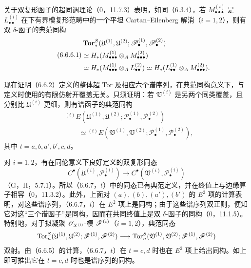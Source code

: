 关于双复形函子的超同调理论（0，11.7.3）表明，如同（6.3.4），若
$M^{(i)}_{\bullet\bullet\bullet}$ 是 $L^{(i)}_{\bullet\bullet}$ 在下有界模复形范畴中的一个平坦 Cartan--Eilenberg 解消（$i=1,2$），则有双 $\delta$-函子的典范同构
\begin{equation}\tag{6.6.6.1}
\begin{aligned}
 &\operatorname{\mathbf{Tor}}^S_*(\mathfrak U^{(1)},\mathfrak U^{(2)};
                    \mathscr P^{(1)}_\bullet,\mathscr P^{(2)}_\bullet)\\
 &\simeq H_*(M^{(1)}_{\bullet\bullet\bullet}\otimes_AM^{(2)}_{\bullet\bullet\bullet})\\
 &\simeq H_*(M^{(1)}_{\bullet\bullet\bullet}\otimes_AL^{(2)}_{\bullet\bullet})
 \simeq H_*(L^{(1)}_{\bullet\bullet}\otimes_AM^{(2)}_{\bullet\bullet\bullet}).
\end{aligned}
\end{equation}

现在证明（6.6.2）定义的整体超 Tor 及相应六个谱序列，在典范同构意义下，与定义时使用的有限仿射开覆盖无关。只须证明：若 $\mathfrak V^{(i)}$ 是另两个同类覆盖，且分别比 $\mathfrak U^{(i)}$ 更细，则有谱函子的典范同构
\begin{equation}\tag{6.6.7,$t$}
\begin{aligned}
 &{}^{(t)}E(\mathfrak U^{(1)},\mathfrak U^{(2)};
                  \mathscr P^{(1)}_\bullet,\mathscr P^{(2)}_\bullet)\\
 &\hspace{2em}\simeq{}^{(t)}E(\mathfrak V^{(1)},\mathfrak V^{(2)};
                  \mathscr P^{(1)}_\bullet,\mathscr P^{(2)}_\bullet),
\end{aligned}
\end{equation}
其中 $t=a,b,a',b',c,d$。

对 $i=1,2$，有在同伦意义下良好定义的双复形同态
\[
 C^\bullet(\mathfrak U^{(i)},\mathscr P^{(i)}_\bullet)
 \longrightarrow C^\bullet(\mathfrak V^{(i)},\mathscr P^{(i)}_\bullet)
\]
（G，II，5.7.1）。所以（6.6.7，$t$）中的同态已有典范定义，并在终值上与边缘算子相容（0，11.3.2）。此外，上面对 $(a),(b),(a'),(b')$ 的 $E^2$ 项的计算表明，对这些谱序列，（6.6.7，$t$）在 $E^2$ 项上是同构；由于这些谱序列双正则，便知它对这“三个谱函子”是同构，因而在共同终值上是双 $\delta$-函子的同构（0，11.1.5）。
特别地，对于拟凝聚 $\mathscr O_{X^{(i)}}$-模 $\mathscr F^{(i)}$（$i=1,2$），典范同态
\[
 \operatorname{Tor}^S_n(\mathfrak U^{(1)},\mathfrak U^{(2)};\mathscr F^{(1)},\mathscr F^{(2)})
 \longrightarrow
 \operatorname{Tor}^S_n(\mathfrak V^{(1)},\mathfrak V^{(2)};\mathscr F^{(1)},\mathscr F^{(2)})
\]
双射。由（6.6.5）的计算，（6.6.7，$t$）在 $t=c,d$ 时也在 $E^2$ 项上给出同构。如上即可推出它在 $t=c,d$ 时也是谱序列的同构。

